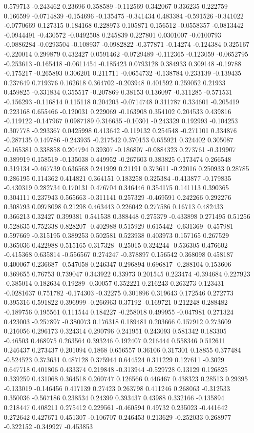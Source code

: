0.579713 -0.243462 0.23696 0.358589 -0.112569 0.342067 0.336235 0.222759 0.166599 -0.0714839 -0.154696 -0.135475 -0.341434 0.483384 -0.591526 -0.341022 -0.0770669 0.127315 0.184168 0.228973 0.105871 0.156512 -0.0558357 -0.0813442 -0.0944491 -0.430572 -0.0492508 0.245839 0.227801 0.0301007 -0.0100793 -0.0886284 -0.0293504 -0.108937 -0.0982822 -0.377871 -0.14274 -0.124384 0.325167 -0.220014 0.299879 0.432427 0.0591462 -0.0729489 -0.112365 -0.123059 -0.0652795 -0.253613 -0.165418 -0.0611454 -0.185423 0.0793128 0.384933 0.309148 -0.19788 -0.175217 -0.265893 0.306201 0.211711 -0.0654732 -0.138784 0.233139 -0.139435 0.237649 0.719376 0.162618 0.364702 -0.203948 0.401592 0.259052 0.21933 0.459825 -0.331834 0.355517 -0.207869 0.38153 0.136097 -0.311285 -0.571531 -0.156293 -0.116814 0.115118 0.204203 -0.0714748 0.311787 0.334601 -0.205419 0.223168 0.655466 -0.120031 0.229069 -0.163908 0.354102 0.204533 0.439816 -0.119122 -0.147967 0.0987189 0.316635 -0.10301 -0.243329 0.192993 -0.104253 0.307778 -0.293367 0.0425998 0.413642 -0.119132 0.254548 -0.271101 0.334876 -0.287135 0.149786 -0.243935 -0.217542 0.370153 0.655921 0.324402 0.305087 -0.165381 0.338858 0.204794 0.39307 -0.186807 -0.0884323 0.273761 -0.319907 0.389919 0.158519 -0.135038 0.449952 -0.267603 0.383825 0.173474 0.266548 0.319134 -0.467739 0.636568 0.241999 0.21191 0.373611 -0.22016 0.250933 0.28785 0.286195 0.114362 0.414821 0.364151 0.183258 0.325384 -0.413877 -0.179835 -0.430319 0.282734 0.170131 0.476704 0.346446 0.354175 0.141113 0.390365 0.304111 0.237943 0.565663 -0.311141 0.257329 -0.469591 0.242266 0.292276 0.308793 0.0978098 0.21298 0.463443 0.226042 0.277586 0.16713 0.482433 0.366213 0.32427 0.399381 0.541538 0.388448 0.275379 -0.433898 0.271495 0.51256 0.528635 0.752338 0.828207 -0.402988 0.515929 0.615442 -0.631369 -0.457981 0.597669 -0.315195 0.389253 0.502581 0.523938 0.403973 0.157165 0.267529 0.365036 0.422988 0.515165 0.317328 -0.25015 0.324244 -0.536305 0.476602 -0.415368 0.635814 -0.556567 0.274247 -0.378897 0.156542 0.368098 0.458187 0.400067 0.236687 -0.547058 0.246347 0.296894 0.696817 -0.288104 0.153606 0.369655 0.76753 0.739047 0.343922 0.33973 0.201545 0.223474 -0.394684 0.227923 -0.385014 0.182634 0.19289 -0.30057 0.352221 0.216243 0.263273 0.123431 -0.0281637 0.751782 -0.174303 -0.32275 0.301896 0.319643 0.172546 0.272773 0.395316 0.591822 0.396999 -0.266963 0.37192 -0.169721 0.212248 0.288482 -0.189756 0.195561 0.111544 0.184227 -0.258018 0.499955 -0.047981 0.271324 0.423003 -0.257897 -0.380073 0.176318 0.189481 0.203666 0.157912 0.273609 0.216056 0.296173 0.324314 0.290796 0.241951 0.243093 0.581342 0.183305 -0.46503 0.468975 0.263564 0.393246 0.192407 0.216444 0.558346 0.512611 0.246437 0.273437 0.201094 0.1868 0.656557 0.36106 0.317301 0.18855 0.377484 -0.524523 0.373631 0.487128 0.375944 0.644524 0.311229 0.127611 -0.3029 0.647718 0.401806 0.433374 0.219848 -0.313944 -0.529728 0.13129 0.126825 0.339259 0.431068 0.364518 0.260747 0.126566 0.446467 0.438323 0.28513 0.29395 -0.133019 -0.146456 0.417139 0.27423 0.263798 0.411246 0.268063 -0.312533 0.350036 -0.567186 0.238534 0.24399 0.393437 0.43988 0.332166 -0.135894 0.218447 0.408211 0.275412 0.229561 -0.460594 0.49732 0.235023 -0.441642 0.272642 0.427671 0.451307 -0.106707 0.246453 0.213629 -0.252033 0.268977 -0.322152 -0.349927 -0.453853 